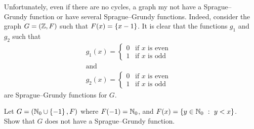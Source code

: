 Unfortunately, even if there are no cycles, a graph my not have a
Sprague--Grundy function or have several
Sprague--Grundy functions. Indeed, consider the graph $G = (\mathbb{Z}, F)$ such
that $F(x) = \set{x - 1}$. It is clear that the functions $g_1$ and $g_2$
such that
\begin{gather*}
    g_1(x) =
    \begin{cases}
        0 & \text{if } x \text{ is even} \\
        1 & \text{if } x \text{ is odd}
    \end{cases} \\
    \text{and} \\
    g_2(x) =
    \begin{cases}
        0 & \text{if } x \text{ is even} \\
        1 & \text{if } x \text{ is odd}
    \end{cases}
\end{gather*}
are Sprague--Grundy functions for $G$.

\begin{exercise}
    Let $G = (\N_0 \cup \set{-1}, F)$ where
    $F(-1) = \mathbb{N}_0$, and $F(x) = \set[y < x]{y \in \N_0}$.
    Show that $G$ does not have a Sprague--Grundy function.
\end{exercise}

